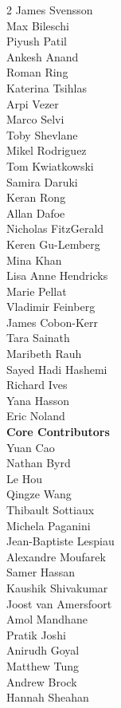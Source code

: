 \begin{multicols}{2}
James Svensson \\
Max Bileschi \\
Piyush Patil \\
Ankesh Anand \\
Roman Ring \\
Katerina Tsihlas \\
Arpi Vezer \\
Marco Selvi \\
Toby Shevlane \\
Mikel Rodriguez \\
Tom Kwiatkowski \\
Samira Daruki \\
Keran Rong \\
Allan Dafoe \\
Nicholas FitzGerald \\
Keren Gu-Lemberg \\
Mina Khan \\
Lisa Anne Hendricks \\
Marie Pellat \\
Vladimir Feinberg \\
James Cobon-Kerr \\
Tara Sainath \\
Maribeth Rauh \\
Sayed Hadi Hashemi \\
Richard Ives \\
Yana Hasson \\
Eric Noland \\
\noindent
\textbf{Core Contributors} \\
Yuan Cao \\
Nathan Byrd \\
Le Hou \\
Qingze Wang \\
Thibault Sottiaux \\
Michela Paganini \\
Jean-Baptiste Lespiau \\
Alexandre Moufarek \\
Samer Hassan \\
Kaushik Shivakumar \\
Joost van Amersfoort \\
Amol Mandhane \\
Pratik Joshi \\
Anirudh Goyal \\
Matthew Tung \\
Andrew Brock \\
Hannah Sheahan \\

\end{multicols}
